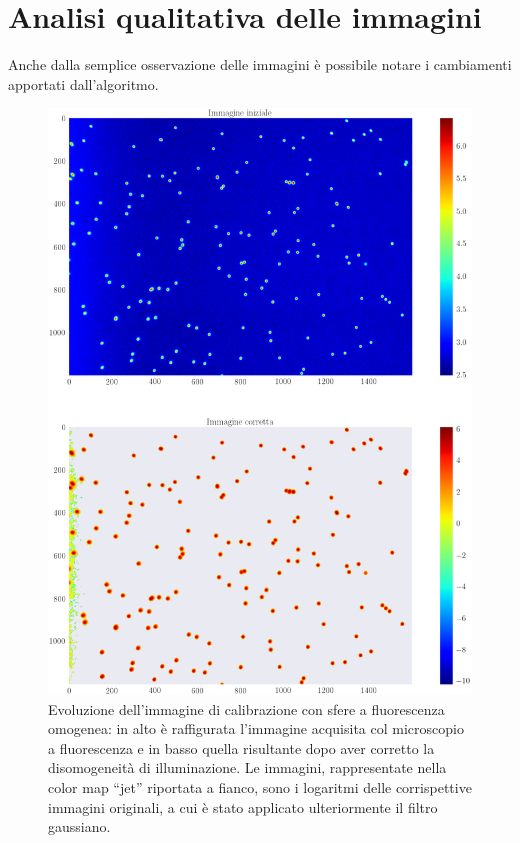 \clearpage{\pagestyle{empty}\cleardoublepage}
\chapter{Analisi qualitativa delle immagini} 
\label{appendiceWSS} 

Anche dalla semplice osservazione delle immagini è possibile notare i cambiamenti apportati dall'algoritmo.

\begin{figure}
 \centering
 \includegraphics[scale=.40]{img/CAP4lg1.png}
 \caption{\small{Evoluzione dell'immagine di calibrazione con sfere a fluorescenza omogenea: in alto è raffigurata l'immagine acquisita col microscopio a fluorescenza e in basso quella risultante dopo aver corretto la disomogeneità di illuminazione. Le immagini, rappresentate nella color map ``jet'' riportata a fianco, sono i logaritmi delle corrispettive immagini originali, a cui è stato applicato ulteriormente il filtro gaussiano.}}
 \label{fig:lg1}
\end{figure}

